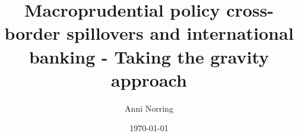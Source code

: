 \documentclass{beamer}
\title[Macroprudential tools, cross-border banking and gravity]{Macroprudential policy cross-border spillovers and international banking - Taking the gravity approach}
\author{Anni Norring}
\institute{PhD Working group September 2018}
\date{\today}
\begin{document}

\begin{frame}
  \titlepage
\end{frame}



\end{document}
